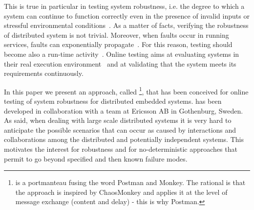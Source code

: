 This is true in particular in testing system robustness, i.e. the degree to which a system can continue to function correctly even in the presence of invalid inputs or stressful environmental conditions~\cite{STANDARD}.
As a matter of facts, verifying the robustness of distributed system is not trivial. %
Moreover, when faults occur in running services, faults can exponentially propagate~\cite{verification_testing}. 
For this reason, testing should become %
also a run-time activity~\cite{towards}. Online testing aims at evaluating systems in their real execution environment~\cite{Bertolino2012} and at validating %
that the system meets its requirements continuously. 


In this paper we present an approach,  called \approach{}\footnote{\approach{} is a portmanteau fusing the word Postman and Monkey. The rational is that the approach is inspired by ChaosMonkey and applies it at the level of message exchange (content and delay) - this is why Postman.}, that has been conceived for online testing of system robustness for distributed embedded systems. \approach{} has been developed in collaboration with a team at Ericsson AB in Gothenburg, Sweden. %
As said, when dealing with large scale distributed systems it is 
very hard to anticipate the possible scenarios that can occur as caused by interactions and collaborations among the distributed and potentially independent systems. This motivates the interest for robustness %
and for no-deterministic approaches that permit to go beyond specified and then known failure modes.

